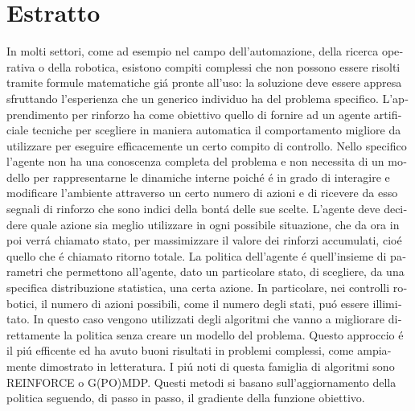 \newcommand{\estrattoname}{Estratto}
\addcontentsline{toc}{chapter}{\estrattoname}

\begingroup
\let\clearpage\relax
\let\cleardoublepage\relax
\let\cleardoublepage\relax

\chapter*{Estratto}
\begin{otherlanguage}{italian}
In molti settori, come ad esempio nel campo dell'automazione, della ricerca operativa o della robotica, esistono compiti complessi che non possono essere risolti tramite formule matematiche gi\'a pronte all'uso: la soluzione deve essere appresa sfruttando l'esperienza che un generico individuo ha del problema specifico.\newline
 L'apprendimento per rinforzo ha come obiettivo quello di fornire ad un agente artificiale tecniche per scegliere in maniera automatica il comportamento migliore da utilizzare per eseguire efficacemente un certo compito di controllo. Nello specifico l'agente non ha una conoscenza completa del problema e non necessita di un modello per rappresentarne le dinamiche interne poich\'e \'e in grado di interagire e modificare l'ambiente attraverso un certo numero di azioni e di ricevere da esso segnali di rinforzo che sono indici della bont\'a delle sue scelte.
L'agente deve decidere quale azione sia meglio utilizzare in ogni possibile situazione, che da ora in poi verr\'a chiamato stato, per massimizzare il valore dei rinforzi accumulati, cio\'e quello che \'e chiamato ritorno totale.
La politica dell'agente \'e quell'insieme di parametri che permettono all'agente, dato un particolare stato, di scegliere, da una specifica distribuzione statistica, una certa azione.
In particolare, nei controlli robotici, il numero di azioni possibili, come il numero degli stati, pu\'o essere illimitato. 
In questo caso vengono utilizzati degli algoritmi che vanno a migliorare direttamente la politica senza creare un modello del problema. 
Questo approccio \'e il pi\'u efficente ed ha avuto buoni risultati in problemi complessi, come ampiamente dimostrato in letteratura. I pi\'u noti di questa famiglia di algoritmi sono REINFORCE o G(PO)MDP.
Questi metodi si basano sull'aggiornamento della politica seguendo, di passo in passo, il gradiente della funzione obiettivo.

\end{otherlanguage}
